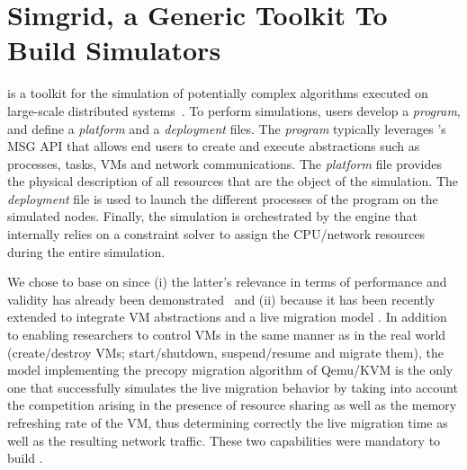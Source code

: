 \vspace*{-.05cm}
\section{Simgrid, a Generic Toolkit To Build Simulators}
\label{sec:sg}

\sg is a toolkit for the simulation of potentially complex algorithms
executed on large-scale distributed
systems~\cite{casanova:hal-01017319}.
%
To perform simulations, users develop a \emph{program}, and define a
\emph{platform} and a \emph{deployment} files. The \emph{program}
typically leverages \sg's MSG API that allows end users to create
and execute \sg abstractions such as processes, tasks, VMs and network
communications. The \emph{platform} file provides the physical
description of all resources that are the object of the simulation.
The \emph{deployment} file is used to launch the different \sg
processes of the program on the simulated nodes.
Finally, the simulation is orchestrated by the \sg engine that
internally relies on a constraint solver to assign the CPU/network
resources during the entire
simulation.%


We chose to base \vmps on \sg
since (i) the latter's relevance in terms of performance and validity
has already been demonstrated~\cite{simgridpub} and (ii) because it
has been recently extended to integrate VM abstractions and a live
migration model \cite{Hirofuchi:2013:ALM:2568486.2568524}. In addition
to enabling researchers to control VMs in the same manner as in the
real world (\eg create/destroy VMs; start/shutdown, suspend/resume and
migrate them), the model implementing the precopy migration algorithm
of Qemu/KVM is the only one that successfully simulates the live
migration behavior by taking into account the competition arising in
the presence of resource sharing as well as the memory refreshing rate
of the VM, thus determining correctly the live migration time as well
as the resulting network traffic. These two capabilities were
mandatory to build \vmps.%



